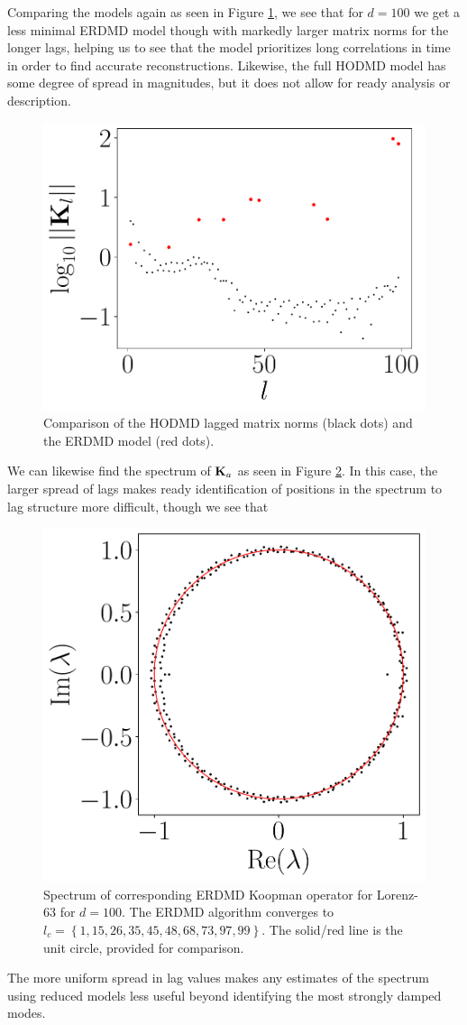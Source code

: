 \documentclass[a4paper,11pt]{article}
\begin{document}
Comparing the models again as seen in Figure \ref{fig:model_comp_d_99}, we see that for $d=100$ we get a less minimal ERDMD model though with markedly larger matrix norms for the longer lags, helping us to see that the model prioritizes long correlations in time in order to find accurate reconstructions.  Likewise, the full HODMD model has some degree of spread in magnitudes, but it does not allow for ready analysis or description.    
\begin{figure}[!h]
\centering
\includegraphics[width=.7\textwidth]{Lorenz_norm_full_model_99}
\caption{Comparison of the HODMD lagged matrix norms (black dots) and the ERDMD model (red dots).}
\label{fig:model_comp_d_99}
\end{figure}
 
We can likewise find the spectrum of ${\bf K}_{a}$ as seen in Figure \ref{fig:lorenz_spectrum_d_100}.  In this case, the larger spread of lags makes ready identification of positions in the spectrum to lag structure more difficult, though we see that 
\begin{figure}[!h]
\centering
\includegraphics[width=.5\textwidth]{Lorenz_spectrum_w_mx_lag_99}
\caption{Spectrum of corresponding ERDMD Koopman operator for Lorenz-63 for $d=100$.  The ERDMD algorithm converges to $l_{c}=\left\{1,15, 26, 35, 45, 48, 68, 73, 97,99\right\}$.  The solid/red line is the unit circle, provided for comparison.}
\label{fig:lorenz_spectrum_d_100}
\end{figure}
The more uniform spread in lag values makes any estimates of the spectrum using reduced models less useful beyond identifying the most strongly damped modes.  
\end{document}
